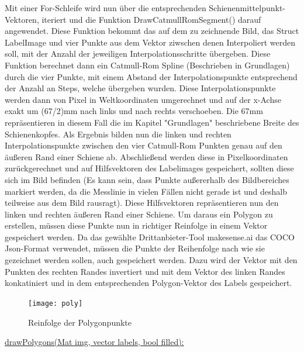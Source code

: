 \documentclass[11pt]{scrartcl}
\begin{document}
\noindent
 Mit einer For-Schleife wird nun über die entsprechenden Schienenmittelpunkt-Vektoren, iteriert und die Funktion DrawCatmullRomSegment() darauf angewendet. Diese Funktion bekommt das auf dem zu zeichnende Bild, das Struct LabelImage und vier Punkte aus dem Vektor ziwschen denen Interpoliert werden soll, mit der Anzahl der jeweiligen Interpolationsschritte übergeben. Diese Funktion berechnet dann ein Catmull-Rom Spline (Beschrieben in Grundlagen) durch die vier Punkte, mit einem Abstand der Interpolationspunkte entsprechend der Anzahl an Steps, welche übergeben wurden. Diese Interpolationspunkte werden dann von Pixel in Weltkoordinaten umgerechnet und auf der x-Achse exakt um (67/2)mm nach links und nach rechts verschoeben. Die 67mm repräsentieren in diesem Fall die im Kapitel "Grundlagen" beschriebene Breite des Schienenkopfes. Als Ergebnis bilden nun die linken und rechten Interpolationspunkte zwischen den vier Catmull-Rom Punkten genau auf den äußeren Rand einer Schiene ab. Abschließend werden diese in Pixelkoordinaten zurückgerechnet und auf Hilfsvektoren des Labelimages gespeichert, sollten diese sich im Bild befinden (Es kann sein, dass Punkte außererhalb des Bildbereiches markiert werden, da die Messlinie in vielen Fällen nicht gerade ist und deshalb teilweise aus dem Bild rausragt). 
Diese Hilfsvektoren repräsentieren nun den linken und rechten äußeren Rand einer Schiene. Um daraus ein Polygon zu erstellen, müssen diese Punkte nun in richtiger Reinfolge in einem Vektor gespeichert werden. Da das gewählte Drittanbieter-Tool makesense.ai das COCO Json-Format verwendet, müssen die Punkte der Reihenfolge nach wie sie gezeichnet werden sollen, auch gespeichert werden. Dazu wird der Vektor mit den Punkten des rechten Randes invertiert und mit dem Vektor des linken Randes konkatiniert und in dem entsprechenden Polygon-Vektor des Labels gespeichert.
\begin{figure}[H]
  \texttt{[image: poly]}
  \caption{Reinfolge der Polygonpunkte}
\end{figure}


\noindent
\underline{drawPolygons(Mat img, vector labels, bool filled):}
\\
\end{document}
